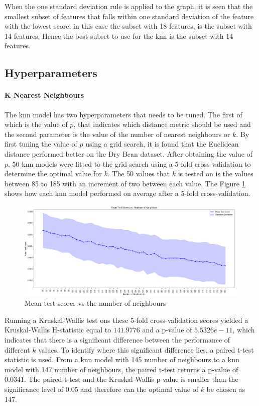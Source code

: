 \documentclass[10pt, conference]{IEEEtran}
\begin{document}
When the one standard deviation rule is applied to the graph, it is seen that the smallest subset of features that falls
within one standard deviation of the feature with the lowest score, in this case the subset with 18 features, is the subset
with 14 features. Hence the best subset to use for the \acrshort{knn} is the subset with 14 features.

\subsection{Hyperparameters}

\paragraph{K Nearest Neighbours}

The \acrshort{knn} model has two hyperparameters that needs to be tuned. The first of which is the value of $p$, that indicates
which distance metric should be used and the second parameter is the value of the number of nearest neighbours or $k$. By first
tuning the value of $p$ using a grid search, it is found that the Euclidean distance performed better on the Dry Bean dataset.
After obtaining the value of $p$, 50 \acrshort{knn} models were fitted to the grid search using a 5-fold cross-validation to
determine the optimal value for $k$. The 50 values that $k$ is tested on is the values between 85 to 185 with an increment of
two between each value. The Figure \ref{KNN_tuning} shows how each \acrshort{knn} model performed on average after a 5-fold cross-validation.

\begin{figure}[h!]
    \centerline{\includegraphics[scale=0.42]{../Plots/KNN_hyperparameter.PNG}}
    \caption{Mean test scores vs the number of neighbours}
    \label{KNN_tuning}
\end{figure}

Running a Kruskal-Wallis test ons these 5-fold cross-validation scores yielded a Kruskal-Wallis H-statistic equal to $141.9776$
and a p-value of $5.5326e-11$, which indicates that there is a significant difference between the performance of different $k$ values.
To identify where this significant difference lies, a paired t-test statistic is used. From a \acrshort{knn} model with 145 number of neighbours
to a \acrshort{knn} model with 147 number of neighbours, the paired t-test returns a p-value of $0.0341$. The paired t-test and the Kruskal-Wallis
p-value is smaller than the significance level of $0.05$ and therefore can the optimal value of $k$ be chosen as 147.
\end{document}
